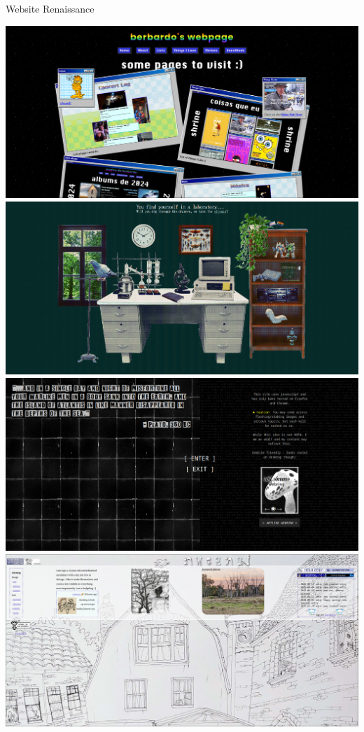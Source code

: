 \documentclass[aspectratio=169,xcolor=dvipsnames]{beamer}
\begin{document}
\begin{frame}{Website Renaissance}
  \begin{center}
    \includegraphics[scale=0.1]{website1.png}
    \includegraphics[scale=0.1]{website2.png}\\
    \includegraphics[scale=0.1]{website3.png}
    \includegraphics[scale=0.1]{website5.png}
  \end{center}
\end{frame}
\end{document}
